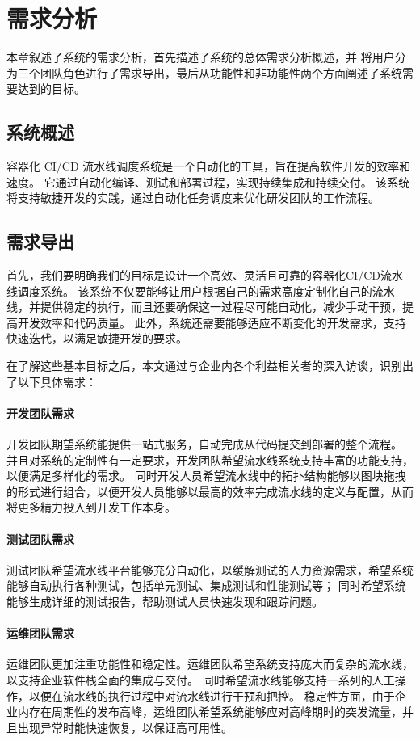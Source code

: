 
\chapter{需求分析}

本章叙述了系统的需求分析，首先描述了系统的总体需求分析概述，并
将用户分为三个团队角色进行了需求导出，最后从功能性和非功能性两个方面阐述了系统需要达到的目标。

\section{系统概述}
容器化 CI/CD 流水线调度系统是一个自动化的工具，旨在提高软件开发的效率和速度。
它通过自动化编译、测试和部署过程，实现持续集成和持续交付。
该系统将支持敏捷开发的实践，通过自动化任务调度来优化研发团队的工作流程。
\section{需求导出}

首先，我们要明确我们的目标是设计一个高效、灵活且可靠的容器化CI/CD流水线调度系统。
该系统不仅要能够让用户根据自己的需求高度定制化自己的流水线，并提供稳定的执行，而且还要确保这一过程尽可能自动化，减少手动干预，提高开发效率和代码质量。
此外，系统还需要能够适应不断变化的开发需求，支持快速迭代，以满足敏捷开发的要求。

在了解这些基本目标之后，本文通过与企业内各个利益相关者的深入访谈，识别出了以下具体需求：

\subsubsection{开发团队需求}
开发团队期望系统能提供一站式服务，自动完成从代码提交到部署的整个流程。
并且对系统的定制性有一定要求，开发团队希望流水线系统支持丰富的功能支持，以便满足多样化的需求。
同时开发人员希望流水线中的拓扑结构能够以图块拖拽的形式进行组合，以便开发人员能够以最高的效率完成流水线的定义与配置，从而将更多精力投入到开发工作本身。

\subsubsection{测试团队需求}
测试团队希望流水线平台能够充分自动化，以缓解测试的人力资源需求，希望系统能够自动执行各种测试，包括单元测试、集成测试和性能测试等；
同时希望系统能够生成详细的测试报告，帮助测试人员快速发现和跟踪问题。

\subsubsection{运维团队需求}
运维团队更加注重功能性和稳定性。运维团队希望系统支持庞大而复杂的流水线，以支持企业软件栈全面的集成与交付。
同时希望流水线能够支持一系列的人工操作，以便在流水线的执行过程中对流水线进行干预和把控。
稳定性方面，由于企业内存在周期性的发布高峰，运维团队希望系统能够应对高峰期时的突发流量，并且出现异常时能快速恢复，以保证高可用性。

